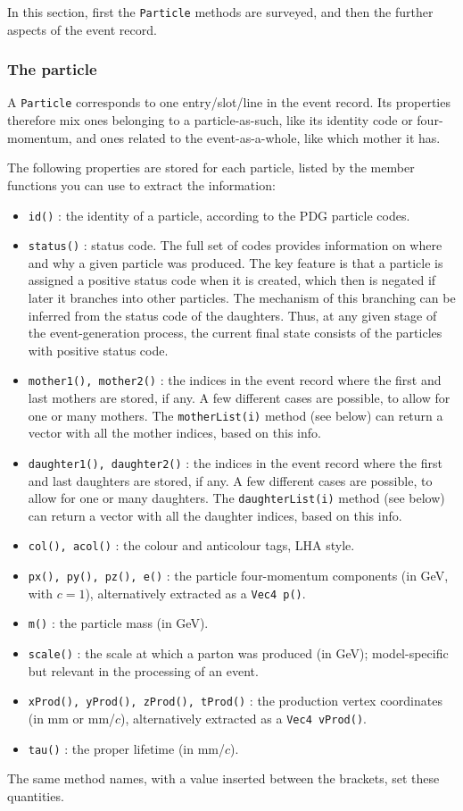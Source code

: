 \documentclass{elsartmod}
\begin{document}
In this section, first the \texttt{Particle} methods are surveyed, 
and then the further aspects of the event record.

\subsubsection{The particle} 

A \texttt{Particle} corresponds to one entry/slot/line in the event 
record. Its properties therefore mix ones belonging to a 
particle-as-such, like its identity code or four-momentum, and ones 
related to the event-as-a-whole, like which mother it has.

The following properties are stored for each particle, listed by the 
member functions you can use to extract the information:
\begin{itemize}
\item \texttt{id()} : 
the identity of a particle, according to the PDG particle codes.
\item \texttt{status()} : 
status code. The full set of codes provides information on where and why 
a given particle was produced. The key feature is that a particle is 
assigned a positive status code when it is created, which then is negated 
if later it branches into other particles. The mechanism of this branching
can be inferred from the status code of the daughters. Thus, at any given 
stage of the event-generation process, the current final state consists of 
the particles with positive status code. 
\item \texttt{mother1(), mother2()} : 
the indices in the event record where the first and last mothers are 
stored, if any. A few different cases are possible, to allow for one 
or many mothers. The \texttt{motherList(i)} method (see below) can 
return a vector with all the mother indices, based on this info.
\item \texttt{daughter1(), daughter2()} : 
the indices in the event record where the first and last daughters are 
stored, if any. A few different cases are possible, to allow for one 
or many daughters. The \texttt{daughterList(i)} method (see below) 
can return a vector with all the daughter indices, based on this info.
\item \texttt{col(), acol()} : 
the colour and anticolour tags, LHA style. 
\item \texttt{px(), py(), pz(), e()} : 
the particle four-momentum components (in GeV, with $c = 1$), 
alternatively extracted  as a \texttt{Vec4 p()}.
\item \texttt{m()} : 
the particle mass (in GeV).
\item \texttt{scale()} : 
the scale at which a parton was produced (in GeV); model-specific
but relevant in the processing of an event.
\item \texttt{xProd(), yProd(), zProd(), tProd()} : 
the production vertex coordinates (in mm or mm/$c$), alternatively 
extracted as a \texttt{Vec4 vProd()}.
\item \texttt{tau()} : the proper lifetime (in mm/$c$).
\end{itemize}
The same method names, with a value inserted between the brackets, 
set these quantities.
\end{document}
